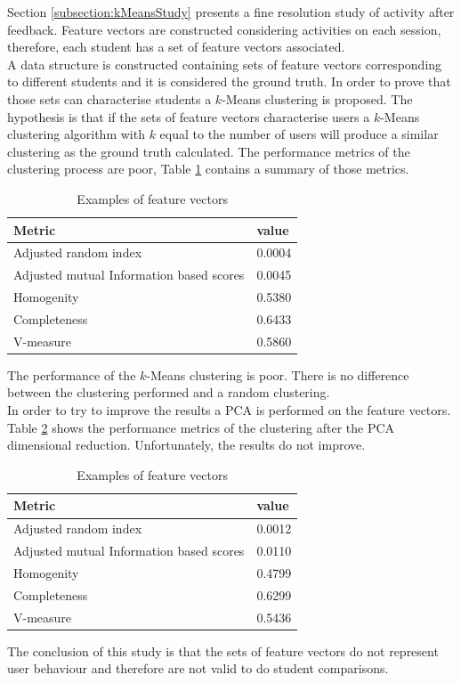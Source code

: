 \documentclass[11pt, oneside]{article}   	%
\begin{document}
Section \ref{subsection:kMeansStudy} presents a fine resolution study of activity after feedback. Feature vectors are constructed considering activities on each session, therefore, each student has a set of feature vectors associated.\\
A data structure is constructed containing sets of feature vectors corresponding to different students and it is considered the ground truth. In order to prove that those sets can characterise students a $k$-Means clustering is proposed. The hypothesis is that if the sets of feature vectors characterise users a $k$-Means clustering algorithm with $k$ equal to the number of users will produce a similar clustering as the ground truth calculated. The performance metrics of the clustering process are poor, Table \ref{table:featureVectorsKMeans2} contains a summary of those metrics.
\begin{table}[h]
	\centering
	\begin{tabular}{| l | l |}
		\hline
		 \textbf{Metric} & \textbf{value} \\ \hline
		 Adjusted random index & 0.0004 \\ \hline
		 Adjusted mutual Information based scores & 0.0045 \\ \hline
		 Homogenity & 0.5380 \\ \hline
		 Completeness & 0.6433\\ \hline
		 V-measure & 0.5860\\ \hline
	\end{tabular}
	\caption{Examples of feature vectors}
	\label{table:featureVectorsKMeans2}
\end{table}
\noindent The performance of the $k$-Means clustering is poor. There is no difference between the clustering performed and a random clustering.\\
In order to try to improve the results a PCA is performed on the feature vectors. Table \ref{table:featureVectorsKMeansPCA2} shows the performance metrics of the clustering after the PCA dimensional reduction. Unfortunately, the results do not improve.
\begin{table}[h]
	\centering
	\begin{tabular}{| l | l |}
		\hline
		 \textbf{Metric} & \textbf{value} \\ \hline
		 Adjusted random index & 0.0012 \\ \hline
		 Adjusted mutual Information based scores & 0.0110 \\ \hline
		 Homogenity & 0.4799 \\ \hline
		 Completeness & 0.6299\\ \hline
		 V-measure & 0.5436\\ \hline
	\end{tabular}
	\caption{Examples of feature vectors}
	\label{table:featureVectorsKMeansPCA2}
\end{table}
The conclusion of this study is that the sets of feature vectors do not represent user behaviour and therefore are not valid to do student comparisons.
\label{conclusion}
\end{document}
